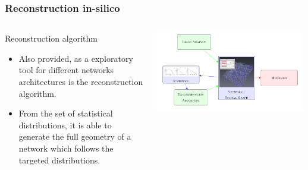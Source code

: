 \documentclass[9pt]{beamer}
\begin{document}
\begin{frame}
  \frametitle{Reconstruction in-silico}
  \begin{columns}[onlytextwidth]
      \begin{exampleblock}{Reconstruction algorithm}
         \begin{itemize}
           \item Also provided, as a exploratory tool for different networks architectures is the reconstruction algorithm.
           \item From the set of statistical distributions, it is able to generate the full geometry of a network which follows the targeted distributions.
         \end{itemize}
       \end{exampleblock}
        \includegraphics[width=0.99\textwidth]{./Figures/project_scheme.png}
  \end{columns}
\end{frame}
\end{document}
